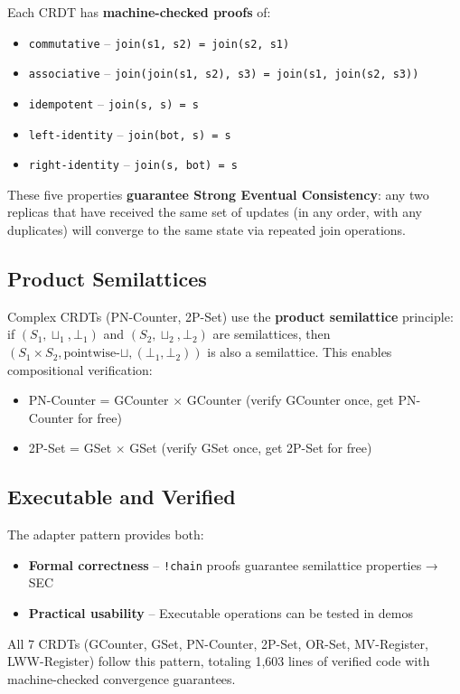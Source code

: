 Each CRDT has \textbf{machine-checked proofs} of:

\begin{itemize}
  \item \texttt{commutative} -- \texttt{join(s1, s2) = join(s2, s1)}
  \item \texttt{associative} -- \texttt{join(join(s1, s2), s3) = join(s1, join(s2, s3))}
  \item \texttt{idempotent} -- \texttt{join(s, s) = s}
  \item \texttt{left-identity} -- \texttt{join(bot, s) = s}
  \item \texttt{right-identity} -- \texttt{join(s, bot) = s}
\end{itemize}

These five properties \textbf{guarantee Strong Eventual Consistency}: any two replicas that have received the same set of updates (in any order, with any duplicates) will converge to the same state via repeated join operations.

\subsection{Product Semilattices}

Complex CRDTs (PN-Counter, 2P-Set) use the \textbf{product semilattice} principle: if $(S_1, \sqcup_1, \bot_1)$ and $(S_2, \sqcup_2, \bot_2)$ are semilattices, then $(S_1 \times S_2, \text{pointwise-}\sqcup, (\bot_1, \bot_2))$ is also a semilattice. This enables compositional verification:

\begin{itemize}
  \item PN-Counter = GCounter $\times$ GCounter (verify GCounter once, get PN-Counter for free)
  \item 2P-Set = GSet $\times$ GSet (verify GSet once, get 2P-Set for free)
\end{itemize}

\subsection{Executable and Verified}

The adapter pattern provides both:

\begin{itemize}
  \item \textbf{Formal correctness} -- \texttt{!chain} proofs guarantee semilattice properties → SEC
  \item \textbf{Practical usability} -- Executable operations can be tested in demos
\end{itemize}

All 7 CRDTs (GCounter, GSet, PN-Counter, 2P-Set, OR-Set, MV-Register, LWW-Register) follow this pattern, totaling 1,603 lines of verified code with machine-checked convergence guarantees.
